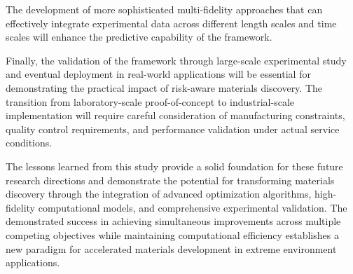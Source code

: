 The development of more sophisticated multi-fidelity approaches that can effectively integrate experimental data across different length scales and time scales will enhance the predictive capability of the framework. 

Finally, the validation of the framework through large-scale experimental study and eventual deployment in real-world applications will be essential for demonstrating the practical impact of risk-aware materials discovery. The transition from laboratory-scale proof-of-concept to industrial-scale implementation will require careful consideration of manufacturing constraints, quality control requirements, and performance validation under actual service conditions.

The lessons learned from this study provide a solid foundation for these future research directions and demonstrate the potential for transforming materials discovery through the integration of advanced optimization algorithms, high-fidelity computational models, and comprehensive experimental validation. The demonstrated success in achieving simultaneous improvements across multiple competing objectives while maintaining computational efficiency establishes a new paradigm for accelerated materials development in extreme environment applications.